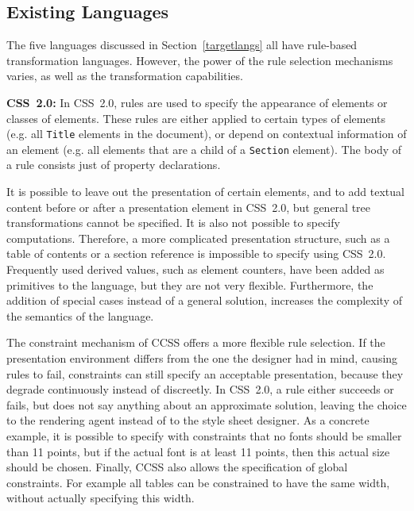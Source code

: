 %									
\subsection{Existing Languages}

The five languages discussed in Section~\ref{targetlangs} all have rule-based transformation languages. However, the power of the rule selection mechanisms varies, as well as the transformation capabilities.{\bf }

{\bf CSS~2.0:} In CSS~2.0, rules are used to specify the appearance of elements or classes of elements. These rules are either applied to certain types of elements (e.g. all \texttt{Title} elements in the document), or depend on contextual information of an element (e.g. all elements that are a child of a \texttt{Section} element). The body of a rule consists just of property declarations.

It is possible to leave out the presentation of certain elements, and to add textual content before or after a presentation element in CSS~2.0, but general tree transformations cannot be specified. It is also not possible to specify computations. Therefore, a more complicated presentation structure, such as a table of contents or a section reference is impossible to specify using CSS~2.0. Frequently used derived values, such as element counters, have been added as primitives to the language, but they are not very flexible. Furthermore, the addition of special cases instead of a general solution, increases the complexity of the semantics of the language.

 The constraint mechanism of CCSS offers a more flexible rule selection. If the presentation environment differs from the one the designer had in mind, causing rules to fail, constraints can still specify an acceptable presentation, because they degrade continuously instead of discreetly. In CSS~2.0, a rule either succeeds or fails, but does not say anything about an approximate solution, leaving the choice to the rendering agent instead of to the style sheet designer. As a concrete example, it is possible to specify with constraints that no fonts should be smaller than 11 points, but if the actual font is at least 11 points, then this actual size should be chosen. Finally, CCSS also allows the specification of global constraints. For example all tables can be constrained to have the same width, without actually specifying this width.

